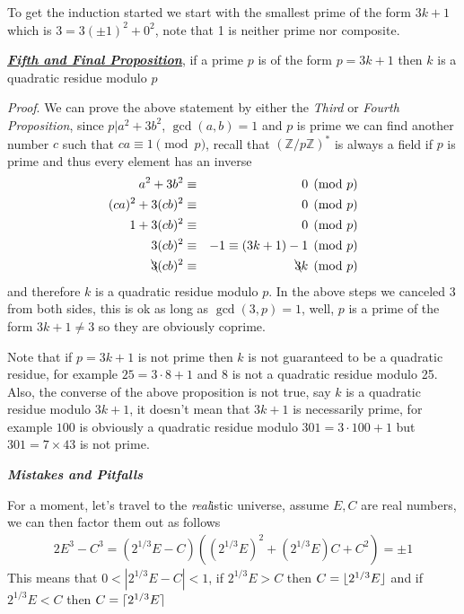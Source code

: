 \documentclass[aps,preprint,preprintnumbers,nofootinbib,showpacs,prd]{revtex4-1}
\newcommand{\nbea}{\begin{eqnarray*}}
\newcommand{\neea}{\end{eqnarray*}}
\DeclarePairedDelimiter{\ceil}{\lceil}{\rceil}
\DeclarePairedDelimiter{\floor}{\lfloor}{\rfloor}
\begin{document}
To get the induction started we start with the smallest prime of the form $3k + 1$ which is $3 = 3(\pm1)^2 + 0^2$, note that 1 is neither prime nor composite.

\underline{\textit{\textbf{Fifth and Final Proposition}}}, if a prime $p$ is of the form $p = 3k+1$ then $k$ is a quadratic residue modulo $p$

{\it Proof}. We can prove the above statement by either the {\it Third} or {\it Fourth Proposition}, since $p|a^2 + 3b^2$, $\gcd(a,b)=1$ and $p$ is prime we can find another number $c$ such that $ca \equiv 1 \pmod{p}$, recall that $(\mathbb{Z}/p\mathbb{Z})^*$ is always a field if $p$ is prime and thus every element has an inverse
%
\nbea
a^2 + 3b^2 & \equiv & 0 \pmod{p} \\
(ca)^2 + 3(cb)^2 & \equiv & 0 \pmod{p} \\
1 + 3(cb)^2 & \equiv & 0 \pmod{p} \\
3(cb)^2 & \equiv & -1 \equiv (3k+1)-1 \pmod{p} \\
\bcancel{3}(cb)^2 & \equiv & \bcancel{3}k \pmod{p}
\neea
%
and therefore $k$ is a quadratic residue modulo $p$. In the above steps we canceled $3$ from both sides, this is ok as long as $\gcd(3,p)=1$, well, $p$ is a prime of the form $3k+1 \neq 3$ so they are obviously coprime.

Note that if $p = 3k+1$ is not prime then $k$ is not guaranteed to be a quadratic residue, for example $25 = 3\cdot 8 + 1$ and $8$ is not a quadratic residue modulo 25. Also, the converse of the above proposition is not true, say $k$ is a quadratic residue modulo $3k+1$, it doesn't mean that $3k+1$ is necessarily prime, for example $100$ is obviously a quadratic residue modulo $301 = 3\cdot100 + 1$ but $301 = 7\times43$ is not prime.

\bigskip
\textit{\textbf{Mistakes and Pitfalls}}
\smallskip

For a moment, let's travel to the {\it real}istic universe, assume $E, C$ are real numbers, we can then factor them out as follows
%
\nbea
2 E^3 - C^3 = (2^{1/3}E - C)((2^{1/3}E)^2 + (2^{1/3}E)C + C^2) = \pm 1
\neea
%
This means that $0 < |2^{1/3}E - C| < 1$, if $2^{1/3}E > C$ then $C = \floor{2^{1/3}E}$ and if $2^{1/3}E < C$ then $C = \ceil{2^{1/3}E}$
\end{document}
